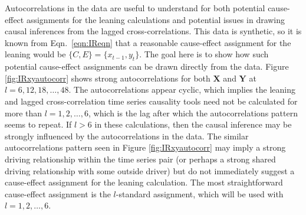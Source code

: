 Autocorrelations in the data are useful to understand for both potential cause-effect assignments for the leaning calculations and potential issues in drawing causal inferences from the lagged cross-correlations.  This data is synthetic, so it is known from Eqn.\ \ref{eqn:IReqn} that a reasonable cause-effect assignment for the leaning would be $\{C,E\}=\{x_{t-1},y_t\}$.  The goal here is to show how such potential cause-effect assignments can be drawn directly from the data.  Figure \ref{fig:IRxyautocorr} shows strong autocorrelations for both $\mathbf{X}$ and $\mathbf{Y}$ at $l=6,12,18,\ldots,48$.  The autocorrelations appear cyclic, which implies the leaning and lagged cross-correlation time series causality tools need not be calculated for more than $l=1,2,\ldots,6$, which is the lag after which the autocorrelations pattern seems to repeat. If $l>6$ in these calculations, then the causal inference may be strongly influenced by the autocorrelations in the data.  The similar autocorrelations pattern seen in Figure \ref{fig:IRxyautocorr} may imply a strong driving relationship within the time series pair (or perhaps a strong shared driving relationship with some outside driver) but do not immediately suggest a cause-effect assignment for the leaning calculation.  The most straightforward cause-effect assignment is the $l$-standard assignment, which will be used with $l = 1,2,\ldots,6$. 

